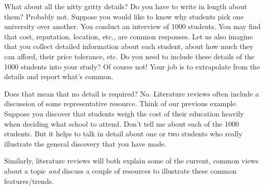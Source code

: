 \documentclass[oneside]{article}
\begin{document}
What about all the nitty gritty details? Do you have to write in length
about them? Probably not. Suppose you would like to know why students
pick one university over another. You conduct an interview of 1000
students. You may find that cost, reputation, location, etc., are common
responses. Let us also imagine that you collect detailed information
about each student, about how much they can afford, their price
tolerance, etc. Do you need to include these details of the 1000
students into your study? Of course not! Your job is to extrapolate from
the details and report what's common.

Does that mean that no detail is required? No. Literature reviews often
include a discussion of some representative resource. Think of our
previous example. Suppose you discover that students weigh the cost of
their education heavily when deciding what school to attend. Don't tell
me about each of the 1000 students. But it helps to talk in detail about
one or two students who really illustrate the general discovery that you
have made.

Similarly, literature reviews will both explain some of the current,
common views about a topic \emph{and} discuss a couple of resources to
illustrate these common features/trends.


\end{document}
